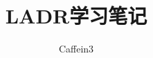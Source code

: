 \documentclass[b5paper]{memoir}
\begin{document}
\frontmatter
\title{LADR学习笔记}
\author{Caffein3}
\date{}
\maketitle
\tableofcontents

\mainmatter

\backmatter
\end{document}
